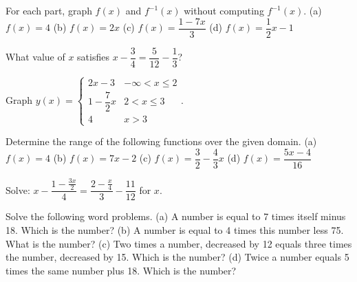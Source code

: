 \documentclass[lang=en,11pt]{elegantbook}
\begin{document}
\begin{reviewset}
\item For each part, graph $f(x)$ and $f^{-1}(x)$ without computing $f^{-1}(x)$.  \newline 
(a) $f(x)=4$ \hspace{60mm} (b) $f(x)=2x$ \newline 
(c) $f(x)=\dfrac{1-7x}{3}$ \hspace{50mm} (d) $f(x)=\dfrac{1}{2}x-1$ \vspace{3mm}

\item What value of $x$ satisfies $x-\dfrac{3}{4}=\dfrac{5}{12}-\dfrac{1}{3}$? \vspace{3mm}

\item Graph $y(x)=\begin{cases} 2x-3 & -\infty < x \leq 2 \\ 1-\dfrac{7}{2}x & 2 < x \leq 3 \\ 4 & x > 3 \end{cases}$.  \vspace{3mm}

\item Determine the range of the following functions over the given domain.  \newline
(a) $f(x)=4$ \hspace{60mm} (b) $f(x)=7x-2$ \newline 
(c) $f(x)=\dfrac{3}{2}-\dfrac{4}{3}x$ \hspace{49mm} (d) $f(x)=\dfrac{5x-4}{16}$ \vspace{3mm}

\item Solve: $x-\dfrac{1-\frac{3x}{2}}{4}=\dfrac{2-\frac{x}{4}}{3}-\dfrac{11}{12}$ for $x$.  \vspace{3mm}

\item Solve the following word problems.  \newline 
(a) A number is equal to 7 times itself minus 18.  Which is the number? \newline 
(b) A number is equal to 4 times this number less 75.  What is the number? \newline 
(c) Two times a number, decreased by 12 equals three times the number, decreased by 15.  Which is the number? \newline 
(d) Twice a number equals 5 times the same number plus 18.  Which is the number? \vspace{3mm}


\end{reviewset}
\end{document}
